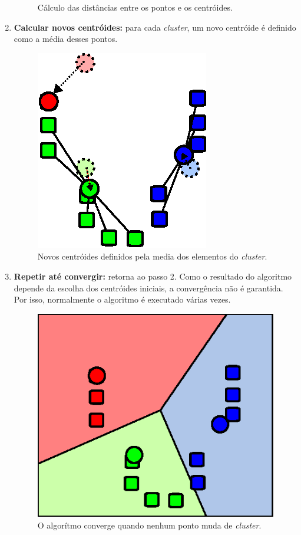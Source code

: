 \begin{enumerate}
\begin{figure}[h]
    \caption{Cálculo das distâncias entre os pontos e os centróides.}
  \end{figure}
  \item \textbf{Calcular novos centróides:} para cada \textit{cluster}, um novo centróide é definido como a média desses pontos.
  \begin{figure}[h]
    \centering
    \includegraphics[scale=0.6]{figuras/kmeans-3.eps}
    \caption{Novos centróides definidos pela media dos elementos do \textit{cluster}.}
  \end{figure}
  \item \textbf{Repetir até convergir:} retorna ao passo 2. Como o resultado do algoritmo depende da escolha dos centróides iniciais, a convergência não é garantida. Por isso, normalmente o algoritmo é executado várias vezes.
  \begin{figure}[h]
    \centering
    \includegraphics[scale=0.6]{figuras/kmeans-4.eps}
    \caption{O algorítmo converge quando nenhum ponto muda de \textit{cluster}.}
  \end{figure}
\end{enumerate}

